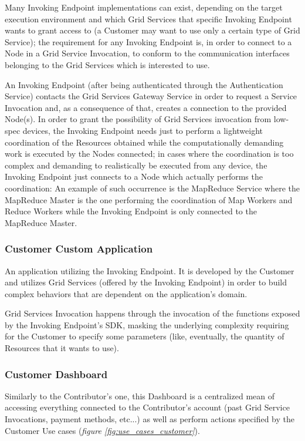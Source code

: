 Many Invoking Endpoint implementations can exist, depending on the target execution environment and which Grid Services that specific Invoking Endpoint wants to grant access to (a Customer may want to use only a certain type of Grid Service); the requirement for any Invoking Endpoint is, in order to connect to a Node in a Grid Service Invocation, to conform to the communication interfaces belonging to the Grid Services which is interested to use.

An Invoking Endpoint (after being authenticated through the Authentication Service) contacts the Grid Services Gateway Service in order to request a Service Invocation and, as a consequence of that, creates a connection to the provided Node(s). In order to grant the possibility of Grid Services invocation from low-spec devices, the Invoking Endpoint needs just to perform a lightweight coordination of the Resources obtained while the computationally demanding work is executed by the Nodes connected; in cases where the coordination is too complex and demanding to realistically be executed from any device, the Invoking Endpoint just connects to a Node which actually performs the coordination: An example of such occurrence is the MapReduce Service where the MapReduce Master is the one performing the coordination of Map Workers and Reduce Workers while the Invoking Endpoint is only connected to the MapReduce Master.

\subsubsection{Customer Custom Application}
An application utilizing the Invoking Endpoint. It is developed by the Customer and utilizes Grid Services (offered by the Invoking Endpoint) in order to build complex behaviors that are dependent on the application's domain.

Grid Services Invocation happens through the invocation of the functions exposed by the Invoking Endpoint's SDK, masking the underlying complexity requiring for the Customer to specify some parameters (like, eventually, the quantity of Resources that it wants to use).

\subsubsection{Customer Dashboard}
Similarly to the Contributor's one, this Dashboard is a centralized mean of accessing everything connected to the Contributor's account (past Grid Service Invocations, payment methods, etc...) as well as perform actions specified by the Customer Use cases (\textit{figure \ref{fig:use_cases_customer}}).

